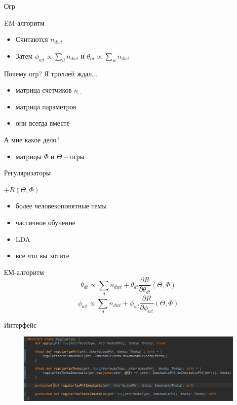 \documentclass{beamer}
\begin{document}
\begin{frame}{Огр}
\begin{block}{EM-алгоритм}
\begin{itemize}
\item Считаются $n_{dwt}$
\item Затем $\phi_{wt} \propto \sum_d n_{dwt}  $ и $\theta_{td} \propto \sum_w n_{dwt}$
\end{itemize}
\end{block}
\begin{block}{Почему огр? Я троллей ждал... }
\begin{itemize}
\item матрица счетчиков $n_{\cdot \cdot}$
\item матрица параметров
\item они всегда вместе
\end{itemize}
\end{block}

\begin{block}{А мне какое дело?}
\begin{itemize}
\item матрицы $\Phi$ и $\Theta$ -- огры
\end{itemize}
\end{block}
\end{frame}

\begin{frame}{Регуляризаторы}
\begin{block}{$+R(\Theta, \Phi)$}
\begin{itemize}
\item более человекопонятные темы
\item частичное обучение
\item LDA
\item все что вы хотите
\end{itemize}
\end{block}

\begin{block}{ЕМ-алгоритм}
$$ \theta_{dt} \propto\sum_d n_{dwt}   + \theta_{dt}\frac{\partial R}{\partial \theta_{dt}} (\Theta, \Phi) $$
$$\phi_{wt} \propto \sum_d n_{dwt} + \phi_{wt}\frac{\partial R}{\partial \phi_{wt}} (\Theta, \Phi)$$
\end{block}

\end{frame}

\begin{frame}{Интерфейс}

\begin{figure}[ht!]
\centering
\includegraphics[width=115mm]{regularizer}
\label{overflow}
\end{figure}
\end{frame}
\end{document}
